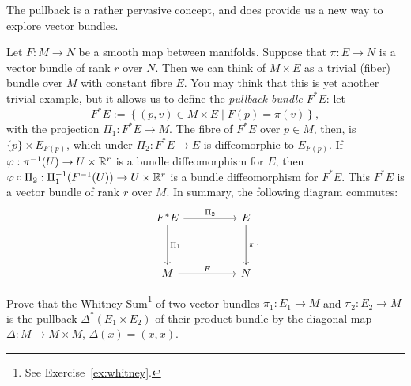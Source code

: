 The pullback is a rather pervasive concept, and does provide us a new way to explore vector bundles.

\begin{example}
  Let $F: M\to N$ be a smooth map between manifolds. Suppose that $\pi: E \to N$ is a vector bundle of rank $r$ over $N$.
  Then we can think of $M\times E$ as a trivial (fiber) bundle over $M$ with constant fibre $E$.
  You may think that this is yet another trivial example, but it allows us to define the \emph{pullback bundle $F^* E$}: let
  \begin{equation}
    F^* E := \left\lbrace (p, v) \in M\times E \mid F(p) = \pi(v)\right\rbrace,
  \end{equation}
  with the projection $\Pi_1: F^* E \to M$.
  The fibre of $F^*E$ over $p\in M$, then, is $\{p\}\times E_{F(p)}$, which under $\Pi_2:F^* E \to E$ is diffeomorphic to $E_{F(p)}$.
  If $\varphi : \pi^{-1}(U) \to U\times\mathbb{R}^r$ is a bundle diffeomorphism for $E$, then $\varphi\circ\Pi_2: \Pi_1^{-1}(F^{-1}(U)) \to U\times\mathbb{R}^r$ is a bundle diffeomorphism for $F^*E$.
  This $F^*E$ is a vector bundle of rank $r$ over $M$.
  In summary, the following diagram commutes:
  \begin{equation}
    \begin{tikzcd}[row sep=huge, column sep=huge]
      F^* E \arrow[r, "\Pi_2"] \arrow[d, "\Pi_1"]
      & E \arrow[d, "\pi"] \\
      M \arrow[r, "F"]
      & N
    \end{tikzcd}.
  \end{equation}
\end{example}

\begin{exercise}
  Prove that the Whitney Sum\footnote{See Exercise~\ref{ex:whitney}.}
  of two vector bundles $\pi_1 : E_1 \to M$ and $\pi_2 : E_2 \to M$
  is the pullback $\Delta^*(E_1 \times E_2)$ of their product bundle by the diagonal map
  $\Delta : M \to M \times M$, $\Delta(x) = (x, x)$.
\end{exercise}


